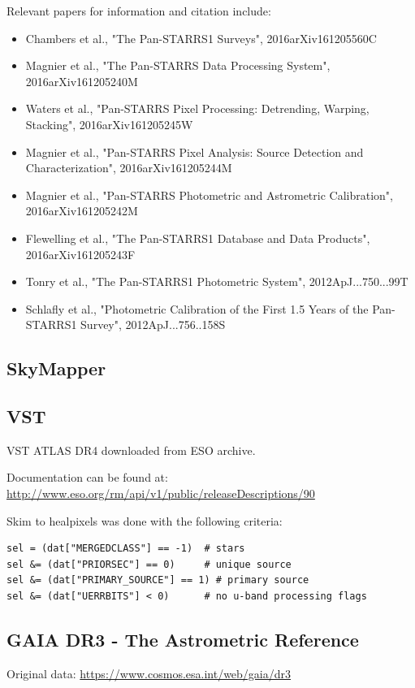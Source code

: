 Relevant papers for information and citation include:
\begin{itemize}
    \item Chambers et al., "The Pan-STARRS1 Surveys", 2016arXiv161205560C
    \item Magnier et al., "The Pan-STARRS Data Processing System", 2016arXiv161205240M
    \item Waters et al., "Pan-STARRS Pixel Processing: Detrending, Warping, Stacking", 2016arXiv161205245W
    \item Magnier et al., "Pan-STARRS Pixel Analysis: Source Detection and Characterization", 2016arXiv161205244M
    \item Magnier et al., "Pan-STARRS Photometric and Astrometric Calibration", 2016arXiv161205242M
    \item Flewelling et al., "The Pan-STARRS1 Database and Data Products", 2016arXiv161205243F
    \item Tonry et al., "The Pan-STARRS1 Photometric System", 2012ApJ...750...99T
    \item Schlafly et al., "Photometric Calibration of the First 1.5 Years of the Pan-STARRS1 Survey", 2012ApJ...756..158S
\end{itemize}

\subsection{SkyMapper}

\subsection{VST}

VST ATLAS DR4 downloaded from ESO archive.

Documentation can be found at: \url{http://www.eso.org/rm/api/v1/public/releaseDescriptions/90}

Skim to healpixels was done with the following criteria:
\begin{verbatim}
sel = (dat["MERGEDCLASS"] == -1)  # stars
sel &= (dat["PRIORSEC"] == 0)     # unique source 
sel &= (dat["PRIMARY_SOURCE"] == 1) # primary source 
sel &= (dat["UERRBITS"] < 0)      # no u-band processing flags
\end{verbatim}

\subsection{GAIA DR3 - The Astrometric Reference}
Original data: \url{https://www.cosmos.esa.int/web/gaia/dr3}

